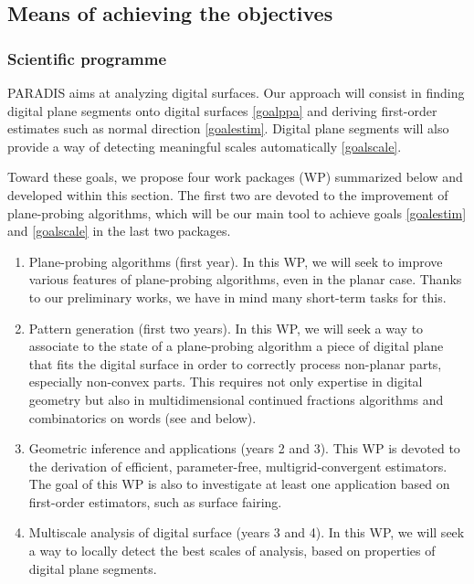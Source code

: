 \subsection{Means of achieving the objectives}


\subsubsection{Scientific programme}
\label{sec:wp}


PARADIS aims at analyzing digital surfaces. Our approach will consist in finding
digital plane segments onto digital surfaces \ref{goalppa} and deriving first-order
estimates such as normal direction \ref{goalestim}. Digital plane segments will
also provide a way of detecting meaningful scales automatically \ref{goalscale}.

Toward these goals, we propose four work packages (WP) summarized below and
developed within this section. The first two are devoted to the improvement of
plane-probing algorithms, which will be our main tool to achieve goals \ref{goalestim}
and \ref{goalscale} in the last two packages. 

\begin{enumerate} [label=(W\arabic*),start=0]
\item Plane-probing algorithms (first year). In this WP, we will seek to
  improve various features of plane-probing algorithms, even in the
  planar case. Thanks to our preliminary works, we have in mind many short-term
  tasks for this.  \label{wp0}
\item Pattern generation (first two years). In this WP, we will seek a way to associate
  to the state of a plane-probing algorithm a piece of digital plane
  that fits the digital surface in order to correctly process non-planar parts,
  especially non-convex parts. This requires not only expertise in
  digital geometry but also in multidimensional continued fractions
  algorithms and combinatorics on words (see  and below).  \label{wp1} 
\item Geometric inference and applications (years 2 and 3). This WP is devoted
  to the derivation of efficient, parameter-free, multigrid-convergent estimators.
  The goal of this WP is also to investigate at least one application based on
  first-order estimators, such as surface fairing. \label{wp2} 
\item Multiscale analysis of digital surface (years 3 and 4). In this WP, we will
  seek a way to locally detect the best scales of analysis, based on properties
  of digital plane segments. \label{wp3}
\end{enumerate}

